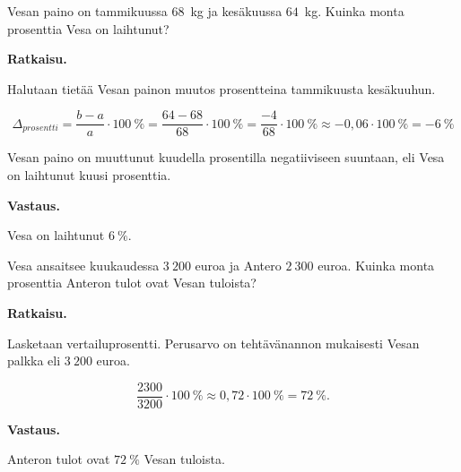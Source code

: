 \begin{esimerkki}
    Vesan paino on tammikuussa $68$~kg ja kesäkuussa $64$~kg. Kuinka monta prosenttia Vesa on laihtunut?
    
    \textbf{Ratkaisu.}
    
    Halutaan tietää Vesan painon muutos prosentteina tammikuusta kesäkuuhun.
    
    \[
        \Delta_{prosentti}
        = \frac{b-a}{a} \cdot 100~\%
        = \frac{64-68}{68} \cdot 100~\%
        = \frac{-4}{68} \cdot 100~\%
        \approx -0,06 \cdot 100~\%
        = -6~\% 
    \]
    
    Vesan paino on muuttunut kuudella prosentilla negatiiviseen suuntaan,
    eli Vesa on laihtunut kuusi prosenttia.
    
    \textbf{Vastaus.}
    
    Vesa on laihtunut $6~\%$.
\end{esimerkki}


\begin{esimerkki}
    Vesa ansaitsee kuukaudessa ${3~200}$ euroa ja Antero ${2~300}$ euroa.
    Kuinka monta prosenttia Anteron tulot ovat Vesan tuloista? 
    
    \textbf{Ratkaisu.}
    
    Lasketaan vertailuprosentti. Perusarvo on tehtävänannon mukaisesti
    Vesan palkka eli ${3~200}$ euroa.
    
    \[
        \frac{2300}{3200} \cdot 100~\%
        \approx 0,72\cdot 100~\%
        = 72~\%.
    \]
    
    \textbf{Vastaus.}
    
    Anteron tulot ovat $72~\%$ Vesan tuloista.
\end{esimerkki}

